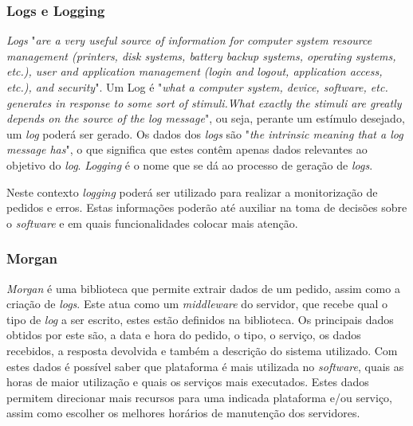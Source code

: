 \subsubsection{Logs e Logging}
\textit{Logs} "\emph{are a very useful source of information for computer system resource management (printers, disk systems, battery backup systems, operating systems, etc.), user and application management (login and logout, application access, etc.), and security}"\citep{Logging}. Um Log é "\emph{what a computer system, device, software, etc. generates in response to some sort of stimuli.What exactly the stimuli are greatly depends on the source of the log message}"\citep{Logging}, ou seja, perante um estímulo desejado, um \textit{log} poderá ser gerado. Os dados dos \textit{logs} são "\emph{the intrinsic meaning that a log message has}"\citep{Logging}, o que significa que estes contêm apenas dados relevantes ao objetivo do \textit{log}. \textit{Logging} é o nome que se dá ao processo de geração de \textit{logs}.

Neste contexto \textit{logging} poderá ser utilizado para realizar a monitorização de pedidos e erros. Estas informações poderão até auxiliar na toma de decisões sobre o \textit{software} e em quais funcionalidades colocar mais atenção.

\subsubsection{Morgan}

\textit{Morgan} é uma biblioteca que permite extrair dados de um pedido, assim como a criação de \textit{logs}. Este atua como um \textit{middleware} do servidor, que recebe qual o tipo de \textit{log} a ser escrito, estes estão definidos na biblioteca. Os principais dados obtidos por este são, a data e hora do pedido, o tipo, o serviço, os dados recebidos, a resposta devolvida e também a descrição do sistema utilizado. Com estes dados é possível saber que plataforma é mais utilizada no \textit{software}, quais as horas de maior utilização e quais os serviços mais executados. Estes dados permitem direcionar mais recursos para uma indicada plataforma e/ou serviço, assim como escolher os melhores horários de manutenção dos servidores.